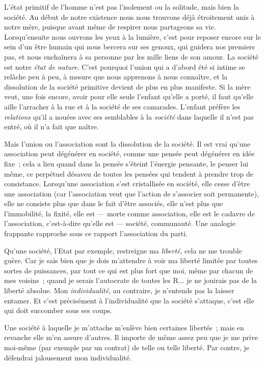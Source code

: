 \documentclass[french,twoside]{book} %
\begin{document}
L’état primitif de l’homme n’est pas l’isolement ou la solitude, mais bien la société. Au début de notre existence nous nous trouvons déjà étroitement unis à notre mère, puisque avant même de respirer nous partageons sa vie. Lorsqu’ensuite nous ouvrons les yeux à la lumière, c’est pour reposer encore sur le sein d’un être humain qui nous bercera sur ses genoux, qui guidera nos premiers pas, et nous enchaînera à sa personne par les mille liens de son amour. La société est notre \emph{état de nature}. C’est pourquoi l’union qui a d’abord été si intime se relâche peu à peu, à mesure que nous apprenons à nous connaître, et la dissolution de la société primitive devient de plus en plus manifeste. Si la mère veut, une fois encore, avoir pour elle seule l’enfant qu’elle a porté,  il faut qu’elle aille l’arracher à la rue et à la société de ses camarades. L’enfant préfère les \emph{relations} qu’il a nouées avec ses semblables à la \emph{société} dans laquelle il n’est pas entré, où il n’a fait que naître.\par
Mais l’union ou l’association sont la dissolution de la société. Il est vrai qu’une association peut dégénérer en société, comme une pensée peut dégénérer en idée fixe ; cela a lieu quand dans la pensée s’éteint l’énergie pensante, le penser lui même, ce perpétuel désaveu de toutes les pensées qui tendent à prendre trop de consistance. Lorsqu’une association s’est cristallisée en société, elle cesse d’être une association (car l’association veut que l’action de s’associer soit permanente), elle ne consiste plus que dans le fait d’être associés, elle n’est plus que l’immobilité, la fixité, elle est — morte comme association, elle est le cadavre de l’association, c’est-à-dire qu’elle est — société, communauté. Une analogie frappante rapproche sous ce rapport l’association du parti.\par
Qu’une société, l’Etat par exemple, restreigne ma \emph{liberté}, cela ne me trouble guère. Car je sais bien que je dois m’attendre à voir ma liberté limitée par toutes sortes de puissances, par tout ce qui est plus fort que moi, même par chacun de mes voisins ; quand je serais l’autocrate de toutes les R... je ne jouirais pas de la liberté absolue. Mon \emph{individualité}, au contraire, je n’entends pas la laisser entamer. Et c’est précisément à l’individualité que la société s’attaque, c’est elle qui doit succomber sous ses coups.\par
Une société à laquelle je m’attache m’enlève bien certaines libertés ; mais en revanche elle m’en assure d’autres. Il importe de même assez peu que je me prive moi-même (par exemple par un contrat) de telle ou telle liberté. Par contre, je défendrai jalousement mon individualité.\par
\end{document}
